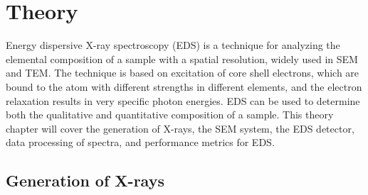 \chapter{Theory}
\label{ch:theory}






Energy dispersive X-ray spectroscopy (EDS) is a technique for analyzing the elemental composition of a sample with a spatial resolution, widely used in SEM and TEM.
The technique is based on excitation of core shell electrons, which are bound to the atom with different strengths in different elements, and the electron relaxation results in very specific photon energies.
EDS can be used to determine both the qualitative and quantitative composition of a sample.
This theory chapter will cover the generation of X-rays, the SEM system, the EDS detector, data processing of spectra, and performance metrics for EDS.



\section{Generation of X-rays}
\label{theory:xray_formation}


